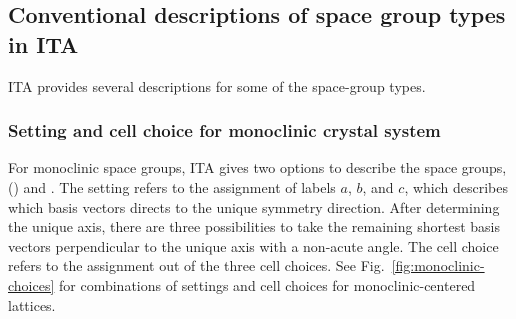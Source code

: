 
\subsection{\label{sec:space-group-alternatives}Conventional descriptions of space group types in ITA}

ITA provides several descriptions for some of the space-group types.

\subsubsection{Setting and cell choice for monoclinic crystal system}

For monoclinic space groups, ITA gives two options to describe the space groups,  () and .
The setting refers to the assignment of labels $a$, $b$, and $c$, which describes which basis vectors directs to the unique symmetry direction.
After determining the unique axis, there are three possibilities to take the remaining shortest basis vectors perpendicular to the unique axis with a non-acute angle.
The cell choice refers to the assignment out of the three cell choices.
See Fig.~\ref{fig:monoclinic-choices} for combinations of settings and cell choices for monoclinic-centered lattices.

